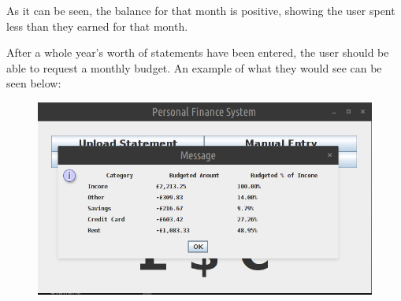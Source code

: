 As it can be seen, the balance for that month is positive, showing the user
spent less than they earned for that month. 

After a whole year's worth of statements have been entered, the user should be
able to request a monthly budget. An example of what they would see can be seen
below:

\begin{figure}[ht!]
  \begin{center}
    \includegraphics[width=14cm]{./contents/img/calculate_monthly_budget.png}
  \end{center}
  \caption{}
\end{figure}
\FloatBarrier
